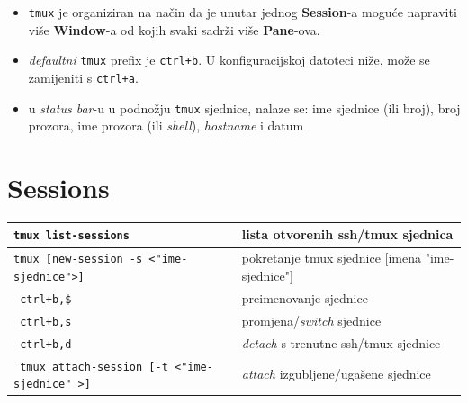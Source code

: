 \documentclass[10pt]{article}
\begin{document}
\renewcommand{\arraystretch}{1.50}

    \begin{itemize}
        \item \texttt{tmux} je organiziran na način da je unutar jednog \textbf{Session}-a moguće napraviti više \textbf{Window}-a od kojih svaki sadrži više \textbf{Pane}-ova.
        \item \textit{defaultni} \texttt{tmux} prefix je \texttt{ctrl+b}. U konfiguracijskoj datoteci niže, može se zamijeniti s \texttt{ctrl+a}. 
        \item u \textit{status bar}-u u podnožju \texttt{tmux} sjednice, nalaze se: ime sjednice (ili broj), broj prozora, ime prozora (ili \textit{shell}), \textit{hostname} i datum
    \end{itemize}

    \section*{\color{ForestGreen} Sessions}
    \begin{tabular}{|>{\tt}p{9.00cm}|>{}p{15.50cm}|}
        \hline
        tmux list-sessions                          &   lista otvorenih ssh/tmux sjednica                   \\ \hline
        tmux [new-session -s <"ime-sjednice">]      &   pokretanje tmux sjednice [imena "ime-sjednice"]     \\ \hline
        ctrl+b,\$                                   &   preimenovanje sjednice                              \\ \hline
        ctrl+b,s                                    &   promjena/\textit{switch} sjednice                   \\ \hline
        ctrl+b,d                                    &   \textit{detach} s trenutne ssh/tmux sjednice        \\ \hline
        tmux attach-session [-t <"ime-sjednice" >]  &   \textit{attach} izgubljene/ugašene sjednice         \\ \hline
    \end{tabular}

\end{document}

